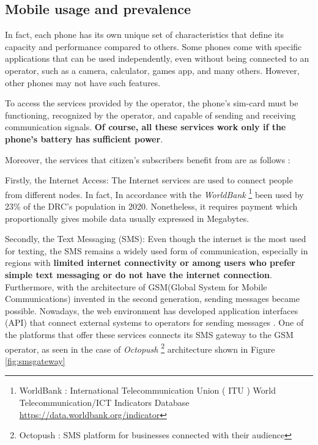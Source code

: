 \documentclass[12pt,a4paper]{report}
\begin{document}
\subsection{Mobile usage and prevalence} 
In fact, each phone has its own unique set of characteristics that define its capacity and performance compared to others. Some phones come with specific applications that can be used independently, even without being connected to an operator, such as a camera, calculator, games app, and many others. However, other phones may not have such features.

To access the services provided by the operator, the phone's sim-card must be functioning, recognized by the operator, and capable of sending and receiving communication signals. \textbf{Of course, all these services work only if the phone's battery has sufficient power}.

Moreover, the services that citizen's subscribers benefit from are as follows : 

Firstly, the Internet Access: The Internet services are used to connect people from different nodes. In fact, In accordance with the \textit{WorldBank} \footnote{WorldBank : International Telecommunication Union ( ITU ) World Telecommunication/ICT Indicators Database \url{https://data.worldbank.org/indicator}}  been used by 23\% of the DRC's population in 2020. Nonetheless, it requires payment which proportionally gives mobile data usually expressed in Megabytes. 

Secondly, the Text Messaging (SMS): Even though the internet is the most used for texting, the SMS remains a widely used form of communication, especially in regions with \textbf{limited internet connectivity or among users who prefer simple text messaging or do not have the internet connection}.
Furthermore, with the architecture of GSM(Global System for Mobile Communications) invented in the second generation, sending messages became possible. Nowadays, the web environment has developed application interfaces (API) that connect external systems to operators for sending messages \cite{hassinen2003secure}. One of the platforms that offer these services connects its SMS gateway to the GSM operator, as seen in the case of \textit{Octopush} \footnote{Octopush : SMS platform for businesses connected with their audience} architecture shown in Figure \ref{fig:smsgateway}  
\end{document}
